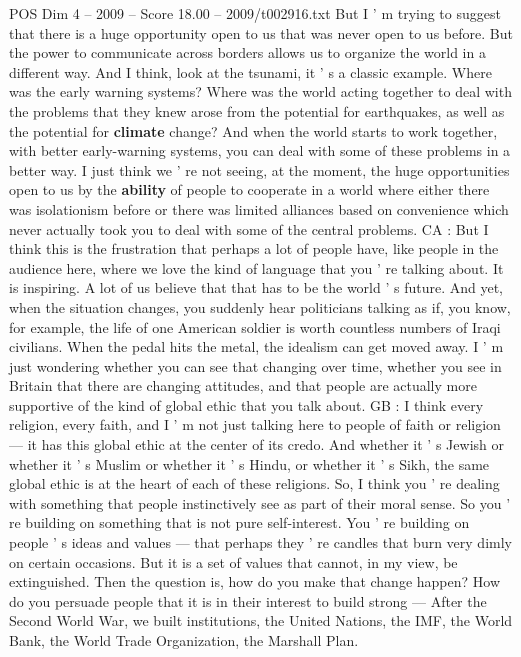 \begin{textsample}{POS Dim 4 – 2009 – Score 18.00 – 2009/t002916.txt}
But I ' m trying to suggest that there is a huge opportunity open to us that was never open to us before.
But the power to communicate across borders allows us to organize the world in a different way.
And I think, look at the tsunami, it ' s a classic example.
Where was the early warning systems?
Where was the world acting together to deal with the problems that they knew arose from the potential for earthquakes, as well as the potential for \textbf{climate} change?
And when the world starts to work together, with better early-warning systems, you can deal with some of these problems in a better way.
I just think we ' re not seeing, at the moment, the huge opportunities open to us by the \textbf{ability} of people to cooperate in a world where either there was isolationism before or there was limited alliances based on convenience which never actually took you to deal with some of the central problems.
CA : But I think this is the frustration that perhaps a lot of people have, like people in the audience here, where we love the kind of language that you ' re talking about.
It is inspiring.
A lot of us believe that that has to be the world ' s future.
And yet, when the situation changes, you suddenly hear politicians talking as if, you know, for example, the life of one American soldier is worth countless numbers of Iraqi civilians.
When the pedal hits the metal, the idealism can get moved away.
I ' m just wondering whether you can see that changing over time, whether you see in Britain that there are changing attitudes, and that people are actually more supportive of the kind of global ethic that you talk about.
GB : I think every religion, every faith, and I ' m not just talking here to people of faith or religion — it has this global ethic at the center of its credo.
And whether it ' s Jewish or whether it ' s Muslim or whether it ' s Hindu, or whether it ' s Sikh, the same global ethic is at the heart of each of these religions.
So, I think you ' re dealing with something that people instinctively see as part of their moral sense.
So you ' re building on something that is not pure self-interest.
You ' re building on people ' s ideas and values — that perhaps they ' re candles that burn very dimly on certain occasions.
But it is a set of values that cannot, in my view, be extinguished.
Then the question is, how do you make that change happen?
How do you persuade people that it is in their interest to build strong — After the Second World War, we built institutions, the United Nations, the IMF, the World Bank, the World Trade Organization, the Marshall Plan.

\end{textsample}
